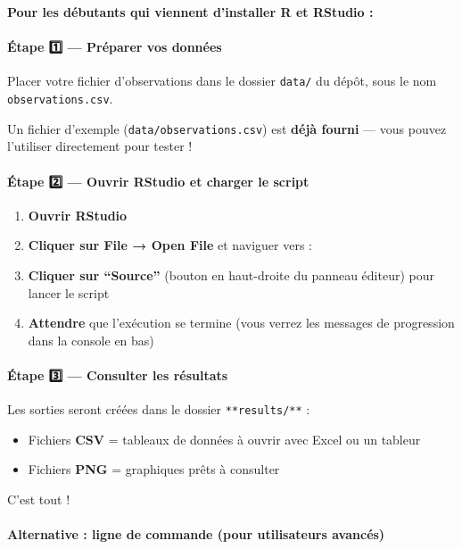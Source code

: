 \textbf{Pour les débutants qui viennent d'installer R et RStudio :}

\paragraph{Étape 1️⃣ --- Préparer vos
données}\label{uxe9tape-1-pruxe9parer-vos-donnuxe9es}

Placer votre fichier d'observations dans le dossier \texttt{data/} du
dépôt, sous le nom \texttt{observations.csv}.

Un fichier d'exemple (\texttt{data/observations.csv}) est \textbf{déjà
fourni} --- vous pouvez l'utiliser directement pour tester !

\paragraph{Étape 2️⃣ --- Ouvrir RStudio et charger le
script}\label{uxe9tape-2-ouvrir-rstudio-et-charger-le-script}

\begin{enumerate}
\def\labelenumi{\arabic{enumi}.}
\tightlist
\item
  \textbf{Ouvrir RStudio}
\item
  \textbf{Cliquer sur File → Open File} et naviguer vers :
\item
  \textbf{Cliquer sur ``Source''} (bouton en haut-droite du panneau
  éditeur) pour lancer le script
\item
  \textbf{Attendre} que l'exécution se termine (vous verrez les messages
  de progression dans la console en bas)
\end{enumerate}

\paragraph{Étape 3️⃣ --- Consulter les
résultats}\label{uxe9tape-3-consulter-les-ruxe9sultats}

Les sorties seront créées dans le dossier \texttt{**results/**} :

\begin{itemize}
\tightlist
\item
  Fichiers \textbf{CSV} = tableaux de données à ouvrir avec Excel ou un
  tableur
\item
  Fichiers \textbf{PNG} = graphiques prêts à consulter
\end{itemize}

C'est tout ! 🎉

\paragraph{Alternative : ligne de commande (pour utilisateurs
avancés)}\label{alternative-ligne-de-commande-pour-utilisateurs-avancuxe9s}

